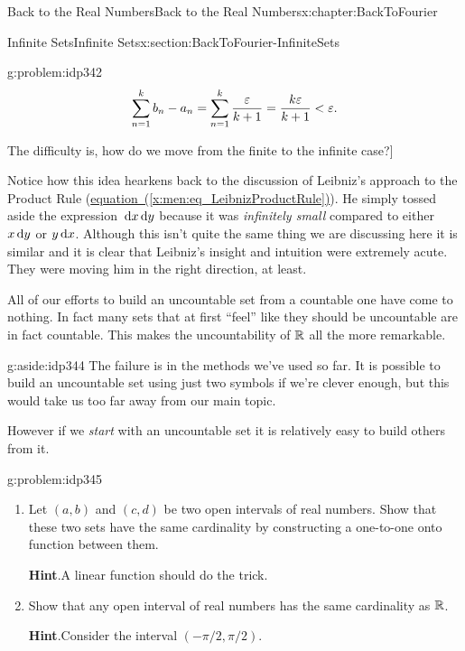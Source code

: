 \begin{chapterptx}{Back to the Real Numbers}{}{Back to the Real Numbers}{}{}{x:chapter:BackToFourier}
\begin{sectionptx}{Infinite Sets}{}{Infinite Sets}{}{}{x:section:BackToFourier-InfiniteSets}
\begin{problem}{}{g:problem:idp342}
			\begin{equation*}
				\sum_{n=1}^kb_n-a_n = \sum_{n=1}^k \frac{\varepsilon}{k+1}=\frac{k\varepsilon}{k+1}<\varepsilon\text{.}
			\end{equation*}
			\par
			The difficulty is, how do we move from the finite to the infinite case?]%
		\end{problem}
		Notice how this idea hearkens back to the discussion of Leibniz's approach to the Product Rule (\hyperref[x:men:eq_LeibnizProductRule]{equation~({\xreffont\ref{x:men:eq_LeibnizProductRule}})}). He simply tossed aside the expression \(\,{\rm d} x\,{\rm d} y\) because it was \emph{infinitely small} compared to either \(x\,{\rm d} y\) or \(y\,{\rm d} x\). Although this isn't quite the same thing we are discussing here it is similar and it is clear that Leibniz's insight and intuition were extremely acute. They were moving him in the right direction, at least.%
		\par
		All of our efforts to build an uncountable set from a countable one have come to nothing. In fact many sets that at first ``feel'' like they should be uncountable are in fact countable. This makes the uncountability of \(\mathbb {R}\) all the more remarkable.%
		\begin{aside}{}{g:aside:idp344}%
			The failure is in the methods we've used so far.  It is possible to build an uncountable set using just two symbols if we're clever enough, but this would take us too far away from our main topic.%
		\end{aside}
		However if we \emph{start} with an uncountable set it is relatively easy to build others from it.%
		\begin{problem}{}{g:problem:idp345}%
			\begin{enumerate}[font=\bfseries,label=(\alph*),ref=\alph*]
				\item{}Let \((a,b)\) and \((c,d)\) be two open intervals of real numbers.  Show that these two sets have the same cardinality by constructing a one-to-one onto function between them.%
				\par\smallskip%
				\noindent\textbf{\blocktitlefont Hint}.\hypertarget{g:hint:idp346}{}\quad{}A linear function should do the trick.%
				\item{}Show that any open interval of real numbers has the same cardinality as \(\mathbb {R}\).%
				\par\smallskip%
				\noindent\textbf{\blocktitlefont Hint}.\hypertarget{g:hint:idp347}{}\quad{}Consider the interval \((-\pi/2,\pi/2)\).%

\end{enumerate}
\end{problem}
\end{sectionptx}
\end{chapterptx}
